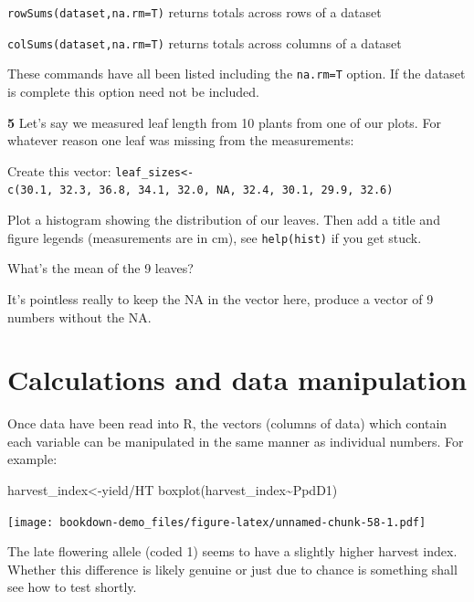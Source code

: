 \documentclass[
]{book}
\makeatletter
\newenvironment{Shaded}{\begin{snugshade}}{\end{snugshade}}
\newcommand{\FunctionTok}[1]{\textcolor[rgb]{0.00,0.00,0.00}{#1}}
\newcommand{\NormalTok}[1]{#1}
\newcommand{\OtherTok}[1]{\textcolor[rgb]{0.56,0.35,0.01}{#1}}
\newcommand{\SpecialCharTok}[1]{\textcolor[rgb]{0.00,0.00,0.00}{#1}}
\newenvironment{kframe}{%
\medskip{}
\setlength{\fboxsep}{.8em}
 \def\at@end@of@kframe{}%
 \ifinner\ifhmode%
  \def\at@end@of@kframe{\end{minipage}}%
  \begin{minipage}{\columnwidth}%
 \fi\fi%
 \def\FrameCommand##1{\hskip\@totalleftmargin \hskip-\fboxsep
 \colorbox{shadecolor}{##1}\hskip-\fboxsep
     \hskip-\linewidth \hskip-\@totalleftmargin \hskip\columnwidth}%
 \MakeFramed {\advance\hsize-\width
   \@totalleftmargin\z@ \linewidth\hsize
   \@setminipage}}%
 {\par\unskip\endMakeFramed%
 \at@end@of@kframe}
\newenvironment{rmdblock}[1]
  {
  \begin{itemize}
  \renewcommand{\labelitemi}{
    \raisebox{-.7\height}[0pt][0pt]{
      {\setkeys{Gin}{width=3em,keepaspectratio}\texttt{[image: images/\#1]}}
    }
  }
  \setlength{\fboxsep}{1em}
  \begin{kframe}
  \item
  }
  {
  \end{kframe}
  \end{itemize}
  }
\newenvironment{rmdquiz}
  {\begin{rmdblock}{quiz}}
  {\end{rmdblock}}
\makeatother
\begin{document}
\texttt{rowSums(dataset,na.rm=T)} returns totals across rows of a dataset

\texttt{colSums(dataset,na.rm=T)} returns totals across columns of a dataset

These commands have all been listed including the \texttt{na.rm=T} option. If the dataset is complete this option need not be included.

\begin{rmdquiz}
\textbf{5} Let's say we measured leaf length from 10 plants from one of our plots. For whatever reason one leaf was missing from the measurements:

Create this vector: \texttt{leaf\_sizes\textless{}-c(30.1,\ 32.3,\ 36.8,\ 34.1,\ 32.0,\ NA,\ 32.4,\ 30.1,\ 29.9,\ 32.6)}

Plot a histogram showing the distribution of our leaves. Then add a title and figure legends (measurements are in cm), see \texttt{help(hist)} if you get stuck.

What's the mean of the 9 leaves?

It's pointless really to keep the NA in the vector here, produce a vector of 9 numbers without the NA.\\
\end{rmdquiz}

\hypertarget{calculations-and-data-manipulation}{%
\section{Calculations and data manipulation}\label{calculations-and-data-manipulation}}

Once data have been read into R, the vectors (columns of data) which contain each variable can be manipulated in the same manner as individual numbers. For example:

\begin{Shaded}
\begin{Highlighting}[]
\NormalTok{harvest\_index}\OtherTok{\textless{}{-}}\NormalTok{yield}\SpecialCharTok{/}\NormalTok{HT}
\FunctionTok{boxplot}\NormalTok{(harvest\_index}\SpecialCharTok{\textasciitilde{}}\NormalTok{PpdD1)}
\end{Highlighting}
\end{Shaded}

\texttt{[image: bookdown-demo\_files/figure-latex/unnamed-chunk-58-1.pdf]}

The late flowering allele (coded 1) seems to have a slightly higher harvest index. Whether this difference is likely genuine or just due to chance is something shall see how to test shortly.
\end{document}
